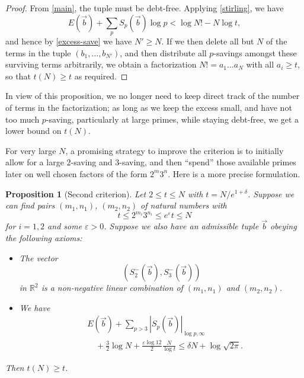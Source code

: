 \documentclass[12pt,a4paper,reqno]{amsart}
\numberwithin{equation}{section}
\theoremstyle{plain}
\newtheorem{proposition}[theorem]{Proposition}
\theoremstyle{definition}
\newcommand\R{\mathbb{R}}
\newcommand\eps{\varepsilon}
\begin{document}
\begin{proof}  From \eqref{main}, the tuple must be debt-free.  Applying \eqref{stirling}, we have
$$ E(\vec b) + \sum_p S_p(\vec b) \log p < \log N! - N\log t,$$
and hence by \eqref{excess-save} we have $N' \geq N$.
If we then delete all but $N$ of the terms in the tuple $(b_1,\dots,b_{N'})$, and then distribute all $p$-savings amongst these surviving terms arbitrarily, we obtain a factorization $N! = a_1 \dots a_N$ with all $a_i \geq t$, so that $t(N) \geq t$ as required.
\end{proof}

In view of this proposition, we no longer need to keep direct track of the number of terms in the factorization; as long as we keep the excess small, and have not too much $p$-saving, particularly at large primes, while staying debt-free, we get a lower bound on $t(N)$. 

For very large $N$, a promising strategy to improve the criterion is to initially allow for a large $2$-saving and $3$-saving, and then ``spend'' those available primes later on well chosen factors of the form $2^m 3^n$.  Here is a more precise formulation.

\begin{proposition}[Second criterion]  Let $2 \leq t \leq N$ with $t = N /e^{1+\delta}$.  Suppose we can find pairs $(m_1,n_1)$, $(m_2,n_2)$ of natural numbers with
\begin{equation}\label{atet}
   t \leq 2^{m_i} 3^{n_i} \leq e^\eps t \leq N
\end{equation}
for $i=1,2$ and some $\eps>0$.  Suppose we also have an admissible tuple $\vec b$ obeying the following axioms:
\begin{itemize}
  \item[(i)]  The vector
\begin{equation}\label{svec}
  (S^-_2(\vec b), S^-_3(\vec b))
\end{equation}
in $\R^2$ is a non-negative linear combination of $(m_1,n_1)$ and $(m_2,n_2)$.
  \item[(ii)]  We have
  \begin{equation}\label{main-2}
    \begin{split} 
&    E(\vec b) + \sum_{p>3} |S_p(\vec b)|_{\log p,\infty} \\
& \quad + \frac{3}{2} \log N + \frac{\eps \log 12}{2} \frac{N}{\log t} \leq \delta N + \log \sqrt{2\pi}.
    \end{split}
  \end{equation}
\end{itemize}
Then $t(N) \geq t$.
\end{proposition}
\end{document}
